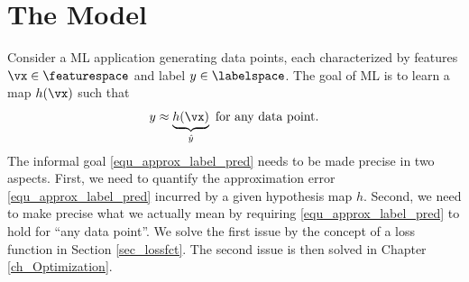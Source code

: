 \documentclass[12pt]{report}
\begin{document}
\section{The Model}
\label{sec_hypo_space}

%

Consider a ML application generating data points, each characterized 
by features $\vx \in \featurespace$ and label $y \in \labelspace$. The goal 
of ML is to learn a map $h(\vx)$ such that 
\begin{equation} 
\label{equ_approx_label_pred}
y \approx \underbrace{h(\vx)}_{\hat{y}} \mbox{ for any data point}. 
\end{equation}  
The informal goal \eqref{equ_approx_label_pred} needs to be made precise 
in two aspects. First, we need to quantify the approximation error \eqref{equ_approx_label_pred} 
incurred by a given hypothesis map $h$. Second, we need to make precise 
what we actually mean by requiring \eqref{equ_approx_label_pred} to hold 
for ``any data point''. We solve the first issue by the concept of a loss 
function in Section \ref{sec_lossfct}. The second issue is then solved 
in Chapter \ref{ch_Optimization}. 


\end{document}

